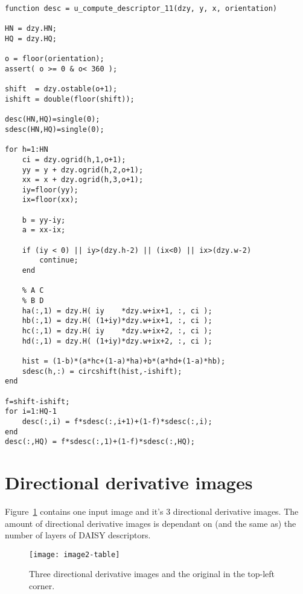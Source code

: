 \begin{lstlisting}
function desc = u_compute_descriptor_11(dzy, y, x, orientation)

HN = dzy.HN;
HQ = dzy.HQ;

o = floor(orientation);
assert( o >= 0 & o< 360 );

shift  = dzy.ostable(o+1);
ishift = double(floor(shift));

desc(HN,HQ)=single(0);
sdesc(HN,HQ)=single(0);

for h=1:HN
    ci = dzy.ogrid(h,1,o+1);
    yy = y + dzy.ogrid(h,2,o+1);
    xx = x + dzy.ogrid(h,3,o+1);
    iy=floor(yy);
    ix=floor(xx);

    b = yy-iy;
    a = xx-ix;

    if (iy < 0) || iy>(dzy.h-2) || (ix<0) || ix>(dzy.w-2)
        continue;
    end

    % A C
    % B D
    ha(:,1) = dzy.H( iy    *dzy.w+ix+1, :, ci );
    hb(:,1) = dzy.H( (1+iy)*dzy.w+ix+1, :, ci );
    hc(:,1) = dzy.H( iy    *dzy.w+ix+2, :, ci );
    hd(:,1) = dzy.H( (1+iy)*dzy.w+ix+2, :, ci );

    hist = (1-b)*(a*hc+(1-a)*ha)+b*(a*hd+(1-a)*hb);
    sdesc(h,:) = circshift(hist,-ishift);
end

f=shift-ishift;
for i=1:HQ-1
    desc(:,i) = f*sdesc(:,i+1)+(1-f)*sdesc(:,i);
end
desc(:,HQ) = f*sdesc(:,1)+(1-f)*sdesc(:,HQ);
\end{lstlisting}

\section{Directional derivative images}

Figure~\ref{fig:grasshopper} contains one input image and it's 3 directional
derivative images. The amount of directional derivative images is dependant on
(and the same as) the number of layers of DAISY descriptors.



\begin{figure}[h]\label{fig:grasshopper}
  \texttt{[image: image2-table]}
  \caption{Three directional derivative images and the original in the top-left
  corner.}
\end{figure}

